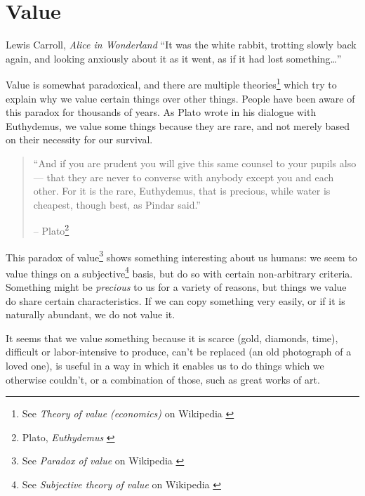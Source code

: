 \chapter{Value}
\label{les:10}

\begin{chapquote}{Lewis Carroll, \textit{Alice in Wonderland}}
\enquote{It was the white rabbit, trotting slowly back again, and looking anxiously
about it as it went, as if it had lost something\ldots}
\end{chapquote}

Value is somewhat paradoxical, and there are multiple theories\footnote{See
\textit{Theory of value (economics)} on Wikipedia \cite{wiki:theory-of-value}}
which try to explain why we value certain things over other things. People have
been aware of this paradox for thousands of years. As Plato wrote in his
dialogue with Euthydemus, we value some things because they are rare, and not
merely based on their necessity for our survival.

\begin{quotation}\begin{samepage}
\enquote{And if you are prudent you will give this same counsel to your pupils
also --- that they are never to converse with anybody except you and
each other. For it is the rare, Euthydemus, that is precious, while
water is cheapest, though best, as Pindar said.}
\begin{flushright} -- Plato\footnote{Plato, \textit{Euthydemus} \cite{euthydemus}}
\end{flushright}\end{samepage}\end{quotation}

This paradox of value\footnote{See \textit{Paradox of value} on Wikipedia
\cite{wiki:paradox-of-value}} shows something interesting about us humans: we
seem to value things on a subjective\footnote{See \textit{Subjective theory of
value} on Wikipedia \cite{wiki:subjective-theory-of-value}} basis, but do so
with certain non-arbitrary criteria. Something might be \textit{precious} to us
for a variety of reasons, but things we value do share certain characteristics.
If we can copy something very easily, or if it is naturally abundant, we do not
value it.

It seems that we value something because it is scarce (gold, diamonds,
time), difficult or labor-intensive to produce, can't be replaced (an
old photograph of a loved one), is useful in a way in which it enables
us to do things which we otherwise couldn't, or a combination of those,
such as great works of art.

